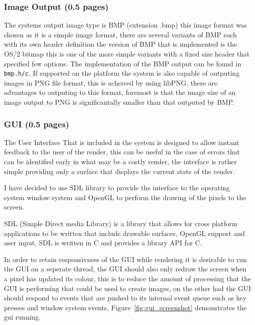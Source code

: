 \subsubsection{Image Output (0.5 pages)}

The systems output image type is BMP (extension .bmp) this image format was chosen as it is a simple image format, there are
several variants of BMP each with its own header definition the version of BMP that is implemented is the OS/2 bitmap this is
one of the more simple variants with a fixed size header that specified few options. The implementation of the BMP output can
be found in \texttt{bmp.h/c}. If supported on the platform the system is also capable of outputing images in PNG file format,
this is acheived by using libPNG, there are advantages to outputing to this format, foremost is that the image size of an
image output to PNG is significantally smaller than that outputed by BMP.


\subsubsection{GUI (0.5 pages)}

The User Interface That is included in the system is designed to allow instant feedback to the user of the render, this can be
useful in the case of errors that can be identified early in what may be a costly render, the interface is rather simple
providing only a surface that displays the current state of the render.

I have decided to use SDL library to provide the interface to the operating system window system and OpenGL to perform the 
drawing of the pixels to the screen.

SDL (Simple Direct media Library) is a library that allows for cross platform applications to be written that include
drawable surfaces, OpenGL support and user input, SDL is written in C and provides a library API for C.

In order to retain responsivness of the GUI while rendering it is desirable to run the GUI on a seperate thread, the GUI
should also only redraw the screen when a pixel has updated its colour, this is to reduce the amount of processing that
the GUI is performing that could be used to create images, on the other had the GUI should respond to events that are pushed
to its internal event queue such as key presses and window system events, Figure~\ref{fig:gui_screenshot} demonstrates the
gui running.

